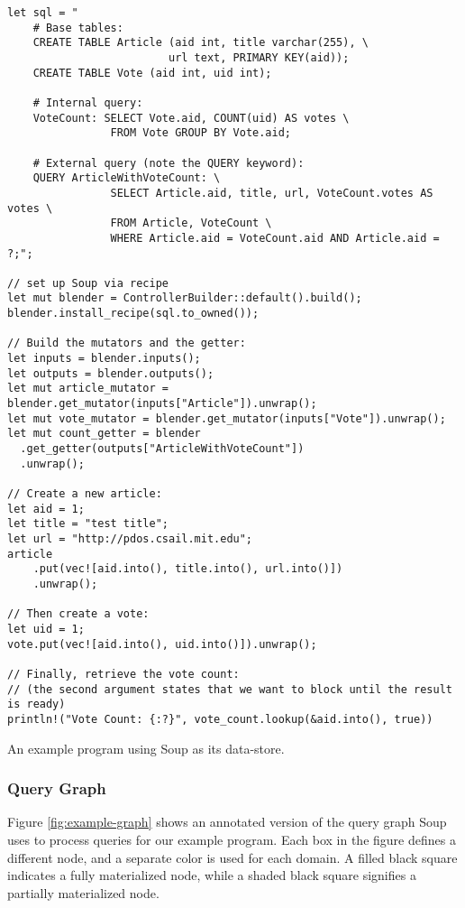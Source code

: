 \documentclass[b5paper]{report}
\begin{document}
\begin{listing}[H]
  \begin{verbatim}
let sql = "
    # Base tables:
    CREATE TABLE Article (aid int, title varchar(255), \
                         url text, PRIMARY KEY(aid));
    CREATE TABLE Vote (aid int, uid int);

    # Internal query:
    VoteCount: SELECT Vote.aid, COUNT(uid) AS votes \
                FROM Vote GROUP BY Vote.aid;

    # External query (note the QUERY keyword):
    QUERY ArticleWithVoteCount: \
                SELECT Article.aid, title, url, VoteCount.votes AS votes \
                FROM Article, VoteCount \
                WHERE Article.aid = VoteCount.aid AND Article.aid = ?;";

// set up Soup via recipe
let mut blender = ControllerBuilder::default().build();
blender.install_recipe(sql.to_owned());

// Build the mutators and the getter:
let inputs = blender.inputs();
let outputs = blender.outputs();
let mut article_mutator = blender.get_mutator(inputs["Article"]).unwrap();
let mut vote_mutator = blender.get_mutator(inputs["Vote"]).unwrap();
let mut count_getter = blender
  .get_getter(outputs["ArticleWithVoteCount"])
  .unwrap();

// Create a new article:
let aid = 1;
let title = "test title";
let url = "http://pdos.csail.mit.edu";
article
    .put(vec![aid.into(), title.into(), url.into()])
    .unwrap();

// Then create a vote:
let uid = 1;
vote.put(vec![aid.into(), uid.into()]).unwrap();

// Finally, retrieve the vote count:
// (the second argument states that we want to block until the result is ready)
println!("Vote Count: {:?}", vote_count.lookup(&aid.into(), true))
  \end{verbatim}
  \caption{
    An example program using Soup as its data-store.
    \label{lst:soup-example}
  }
\end{listing}

\subsubsection{Query Graph}
Figure \ref{fig:example-graph} shows an annotated version of the query graph
Soup uses to process queries for our example program. Each box in the figure
defines a different node, and a separate color is used for each domain. A filled
black square indicates a fully materialized node, while a shaded black
square signifies a partially materialized node.
\end{document}
